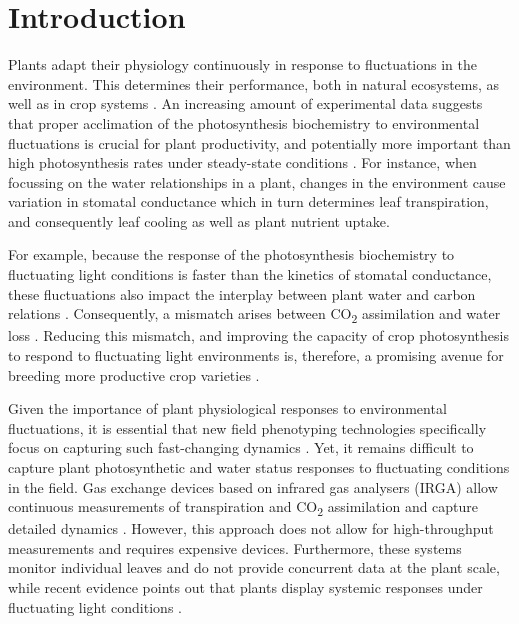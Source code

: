 \section{Introduction}

    Plants adapt their physiology continuously in response to fluctuations in the environment. This determines their performance, both in natural ecosystems, as well as in crop systems \citep{schurrFunctional2006,arsovaDynamics2020}. An increasing amount of experimental data suggests that proper acclimation of the photosynthesis biochemistry to environmental fluctuations is crucial for plant productivity, and potentially more important than high photosynthesis rates under steady-state conditions \citep{kaiserFluctuating2018,kromdijkImproving2016,vialet-chabrandImportance2017,matthewsAcclimation2018,townsendSuboptimal2018}.
    For instance, when focussing on the water relationships in a plant, changes in the environment cause variation in stomatal conductance which in turn determines leaf transpiration, and consequently leaf cooling as well as plant nutrient uptake.
    
    For example, because the response of the photosynthesis biochemistry to fluctuating light conditions is faster than the kinetics of stomatal conductance, these fluctuations also impact the interplay between plant water and carbon relations \citep{lawsonImproving2012,lawsonStomatal2014}. Consequently, a mismatch arises between CO\textsubscript{2} assimilation and water loss \citep{mcauslandEffects2016}. Reducing this mismatch, and improving the capacity of crop photosynthesis to respond to fluctuating light environments is, therefore, a promising avenue for breeding more productive crop varieties \citep{salterRate2019,murchieDynamic2020}. 
    
    Given the importance of plant physiological responses to environmental fluctuations,  it is essential that new field phenotyping technologies specifically focus on capturing such fast-changing dynamics \citep{murchieMeasuring2018}. Yet, it remains difficult to capture plant photosynthetic and water status responses to fluctuating conditions in the field. Gas exchange devices based on infrared gas analysers (IRGA) allow continuous measurements of transpiration and CO\textsubscript{2} assimilation and capture detailed dynamics \citep{kromdijkImproving2016}. However, this approach does not allow for high-throughput measurements and requires expensive devices. Furthermore, these systems monitor individual leaves and do not provide concurrent data at the plant scale, while recent evidence points out that plants display systemic responses under fluctuating light conditions \citep{shimadzuWhole2019}. 
    
